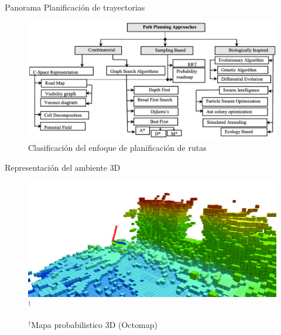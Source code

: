 \documentclass[
  24pt, %
  aspectratio=169, %
]{beamer}
\begin{document}
\begin{frame}{Panorama Planificación de trayectorias}
  \begin{figure}
    \centering
    \includegraphics[scale=0.33]{path_planning_panorama}
    \caption[Caption for LOF]{Clasificación del enfoque de planificación de rutas\footnotemark}
  \end{figure}
\end{frame}

\begin{frame}{Representación del ambiente 3D}
  \begin{figure}
    \centering
    \includegraphics[scale=0.45]{octomapas}$^\dag$\\
    \rule{0in}{1.2em}$^\dag$\scriptsize Mapa probabilistico 3D (Octomap)
  \end{figure}
\end{frame}
\end{document}
